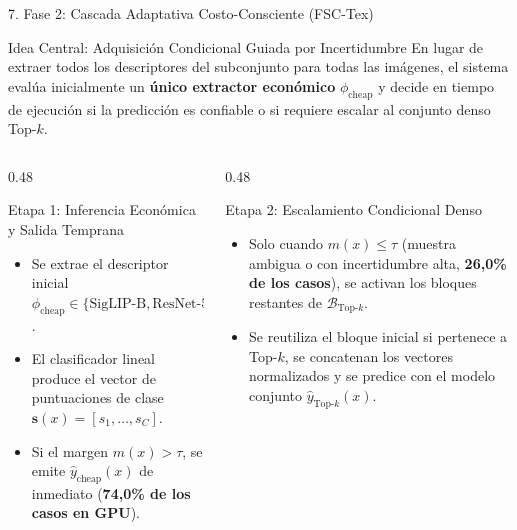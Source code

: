 \documentclass[aspectratio=169,10pt]{beamer}
\begin{document}
\begin{frame}{7. Fase 2: Cascada Adaptativa Costo-Consciente (FSC-Tex)}
\begin{block}{Idea Central: Adquisición Condicional Guiada por Incertidumbre}
En lugar de extraer todos los descriptores del subconjunto para todas las imágenes, el sistema evalúa inicialmente un \textbf{único extractor económico} $\phi_{\text{cheap}}$ y decide en tiempo de ejecución si la predicción es confiable o si requiere escalar al conjunto denso Top-$k$.
\end{block}

\begin{columns}[T]
\begin{column}{0.48\textwidth}
\begin{exampleblock}{Etapa 1: Inferencia Económica y Salida Temprana}
\begin{itemize}
\item Se extrae el descriptor inicial $\phi_{\text{cheap}} \in \{\text{SigLIP-B}, \text{ResNet-50}, \text{BEiT-v2-B}, \text{ConvNeXt-V2-T}\}$.
\item El clasificador lineal produce el vector de puntuaciones de clase $\mathbf{s}(x) = [s_1, \dots, s_C]$.
\item Si el margen $m(x) > \tau$, se emite $\hat{y}_{\text{cheap}}(x)$ de inmediato (\textbf{74,0\% de los casos en GPU}).
\end{itemize}
\end{exampleblock}
\end{column}
\begin{column}{0.48\textwidth}
\begin{alertblock}{Etapa 2: Escalamiento Condicional Denso}
\begin{itemize}
\item Solo cuando $m(x) \le \tau$ (muestra ambigua o con incertidumbre alta, \textbf{26,0\% de los casos}), se activan los bloques restantes de $\mathcal{B}_{\text{Top-}k}$.
\item Se reutiliza el bloque inicial si pertenece a Top-$k$, se concatenan los vectores normalizados y se predice con el modelo conjunto $\hat{y}_{\text{Top-}k}(x)$.
\end{itemize}
\end{alertblock}
\end{column}
\end{columns}
\end{frame}
\end{document}
